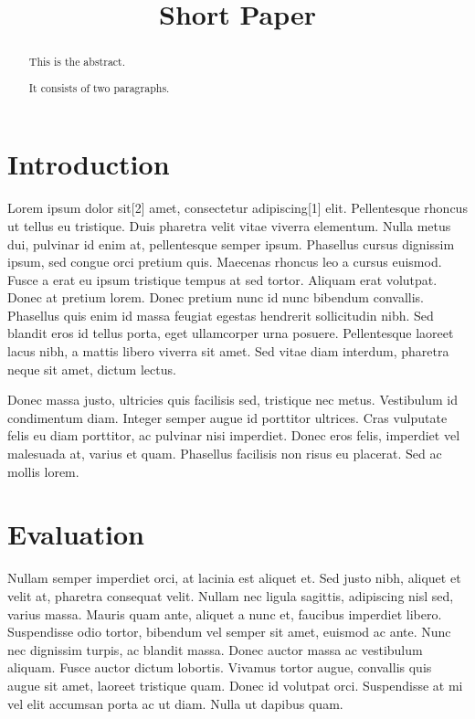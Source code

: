 \documentclass{acm_proc_article-sp}
\title{Short Paper}
\author{
\alignauthor Alice Anonymous \\
        \affaddr{Some Institute of Technology}\\
       \email{\href{mailto:alice@example.com}{\nolinkurl{alice@example.com}}}
\and \alignauthor Bob Security \\
        \affaddr{Another University}\\
       \email{\href{mailto:bob@example.com}{\nolinkurl{bob@example.com}}}
\and }
\date{}
\begin{document}
\maketitle

\begin{abstract}
This is the abstract.

It consists of two paragraphs.
\end{abstract}

\hypertarget{introduction}{%
\section{Introduction}\label{introduction}}

Lorem ipsum dolor sit{[}2{]} amet, consectetur adipiscing{[}1{]} elit.
Pellentesque rhoncus ut tellus eu tristique. Duis pharetra velit vitae
viverra elementum. Nulla metus dui, pulvinar id enim at, pellentesque
semper ipsum. Phasellus cursus dignissim ipsum, sed congue orci pretium
quis. Maecenas rhoncus leo a cursus euismod. Fusce a erat eu ipsum
tristique tempus at sed tortor. Aliquam erat volutpat. Donec at pretium
lorem. Donec pretium nunc id nunc bibendum convallis. Phasellus quis
enim id massa feugiat egestas hendrerit sollicitudin nibh. Sed blandit
eros id tellus porta, eget ullamcorper urna posuere. Pellentesque
laoreet lacus nibh, a mattis libero viverra sit amet. Sed vitae diam
interdum, pharetra neque sit amet, dictum lectus.

Donec massa justo, ultricies quis facilisis sed, tristique nec metus.
Vestibulum id condimentum diam. Integer semper augue id porttitor
ultrices. Cras vulputate felis eu diam porttitor, ac pulvinar nisi
imperdiet. Donec eros felis, imperdiet vel malesuada at, varius et quam.
Phasellus facilisis non risus eu placerat. Sed ac mollis lorem.

\hypertarget{evaluation}{%
\section{Evaluation}\label{evaluation}}

Nullam semper imperdiet orci, at lacinia est aliquet et. Sed justo nibh,
aliquet et velit at, pharetra consequat velit. Nullam nec ligula
sagittis, adipiscing nisl sed, varius massa. Mauris quam ante, aliquet a
nunc et, faucibus imperdiet libero. Suspendisse odio tortor, bibendum
vel semper sit amet, euismod ac ante. Nunc nec dignissim turpis, ac
blandit massa. Donec auctor massa ac vestibulum aliquam. Fusce auctor
dictum lobortis. Vivamus tortor augue, convallis quis augue sit amet,
laoreet tristique quam. Donec id volutpat orci. Suspendisse at mi vel
elit accumsan porta ac ut diam. Nulla ut dapibus quam.
\end{document}
